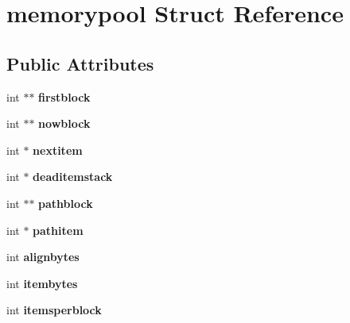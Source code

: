 \hypertarget{structmemorypool}{\section{memorypool Struct Reference}
\label{structmemorypool}
}
\subsection*{Public Attributes}
\begin{DoxyCompactItemize}
\item 
\hypertarget{structmemorypool_a6f447c993c6a09f97e1a94413da3d6ab}{int $\ast$$\ast$ {\bfseries firstblock}}\label{structmemorypool_a6f447c993c6a09f97e1a94413da3d6ab}

\item 
\hypertarget{structmemorypool_a35e1c85e9136545daa60fc4269ada9af}{int $\ast$$\ast$ {\bfseries nowblock}}\label{structmemorypool_a35e1c85e9136545daa60fc4269ada9af}

\item 
\hypertarget{structmemorypool_aefc3f7cee43dda32631ccc33f29501ea}{int $\ast$ {\bfseries nextitem}}\label{structmemorypool_aefc3f7cee43dda32631ccc33f29501ea}

\item 
\hypertarget{structmemorypool_a1d980549e89da9dda8f8a8aa63ef4529}{int $\ast$ {\bfseries deaditemstack}}\label{structmemorypool_a1d980549e89da9dda8f8a8aa63ef4529}

\item 
\hypertarget{structmemorypool_a5c5caa2aadd1317ac5a4aa5db4421aac}{int $\ast$$\ast$ {\bfseries pathblock}}\label{structmemorypool_a5c5caa2aadd1317ac5a4aa5db4421aac}

\item 
\hypertarget{structmemorypool_a53a530dbf82748c9fe185b01dffef55e}{int $\ast$ {\bfseries pathitem}}\label{structmemorypool_a53a530dbf82748c9fe185b01dffef55e}

\item 
\hypertarget{structmemorypool_a143c77d997e424a4be406ee4b3338c12}{int {\bfseries alignbytes}}\label{structmemorypool_a143c77d997e424a4be406ee4b3338c12}

\item 
\hypertarget{structmemorypool_a2658208bb7b2949b51f679e0a8278e3b}{int {\bfseries itembytes}}\label{structmemorypool_a2658208bb7b2949b51f679e0a8278e3b}

\item 
\hypertarget{structmemorypool_a725760a5cc69917ea955ce4b64ed022f}{int {\bfseries itemsperblock}}\label{structmemorypool_a725760a5cc69917ea955ce4b64ed022f}


\end{DoxyCompactItemize}

